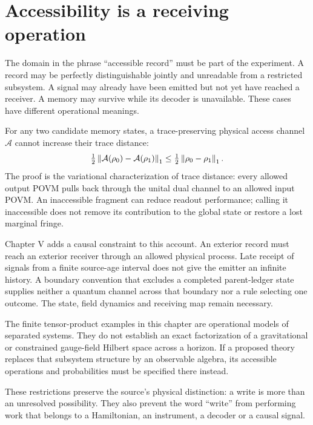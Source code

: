 \section{Accessibility is a receiving operation}
The domain in the phrase ``accessible record'' must be part of the experiment. A record may be perfectly distinguishable jointly and unreadable from a restricted subsystem. A signal may already have been emitted but not yet have reached a receiver. A memory may survive while its decoder is unavailable. These cases have different operational meanings.

For any two candidate memory states, a trace-preserving physical access channel $\mathcal A$ cannot increase their trace distance:
\begin{equation}
 \tfrac12\left\lVert\mathcal A(\rho_0)-\mathcal A(\rho_1)\right\rVert_1
 \leq\tfrac12\left\lVert\rho_0-\rho_1\right\rVert_1.
\end{equation}
The proof is the variational characterization of trace distance: every allowed output POVM pulls back through the unital dual channel to an allowed input POVM. An inaccessible fragment can reduce readout performance; calling it inaccessible does not remove its contribution to the global state or restore a lost marginal fringe.

Chapter V adds a causal constraint to this account. An exterior record must reach an exterior receiver through an allowed physical process. Late receipt of signals from a finite source-age interval does not give the emitter an infinite history. A boundary convention that excludes a completed parent-ledger state supplies neither a quantum channel across that boundary nor a rule selecting one outcome. The state, field dynamics and receiving map remain necessary.

The finite tensor-product examples in this chapter are operational models of separated systems. They do not establish an exact factorization of a gravitational or constrained gauge-field Hilbert space across a horizon. If a proposed theory replaces that subsystem structure by an observable algebra, its accessible operations and probabilities must be specified there instead.

These restrictions preserve the source's physical distinction: a write is more than an unresolved possibility. They also prevent the word ``write'' from performing work that belongs to a Hamiltonian, an instrument, a decoder or a causal signal.


